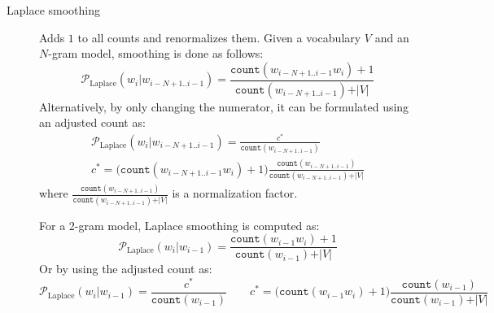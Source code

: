 \begin{description}
    \item[Laplace smoothing] 
        Adds $1$ to all counts and renormalizes them. Given a vocabulary $V$ and an $N$-gram model, smoothing is done as follows:
        \[
            \mathcal{P}_\text{Laplace}(w_i | w_{i-N+1..i-1}) = \frac{\texttt{count}(w_{i-N+1..i-1}w_i) + 1}{\texttt{count}(w_{i-N+1..i-1}) + \vert V \vert}
        \]
        Alternatively, by only changing the numerator, it can be formulated using an adjusted count as:
        \[
            \begin{gathered}
                \mathcal{P}_\text{Laplace}(w_i | w_{i-N+1..i-1}) = \frac{c^*}{\texttt{count}(w_{i-N+1..i-1})} \\
                c^* = \big( \texttt{count}(w_{i-N+1..i-1}w_i) + 1 \big) \frac{\texttt{count}(w_{i-N+1..i-1})}{\texttt{count}(w_{i-N+1..i-1}) + \vert V \vert}
            \end{gathered}
        \]
        where $\frac{\texttt{count}(w_{i-N+1..i-1})}{\texttt{count}(w_{i-N+1..i-1}) + \vert V \vert}$ is a normalization factor.

        \begin{example}
            For a 2-gram model, Laplace smoothing is computed as:
            \[
                \mathcal{P}_\text{Laplace}(w_i | w_{i-1}) = \frac{\texttt{count}(w_{i-1}w_i) + 1}{\texttt{count}(w_{i-1}) + \vert V \vert}
            \]
            Or by using the adjusted count as:
            \[
                \mathcal{P}_\text{Laplace}(w_i | w_{i-1}) = \frac{c^*}{\texttt{count}(w_{i-1})}
                \qquad
                c^* = \big( \texttt{count}(w_{i-1}w_i) + 1 \big) \frac{\texttt{count}(w_{i-1})}{\texttt{count}(w_{i-1}) + \vert V \vert}
            \]
        \end{example}
\end{description}